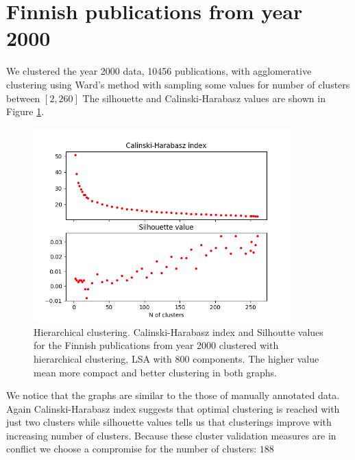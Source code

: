 \section{Finnish publications from year 2000}
We clustered the year 2000 data, 10456 publications, with 
agglomerative clustering using Ward's method with sampling some values
for number of clusters between $[2,260]$ 
The silhouette and Calinski-Harabasz values are shown in Figure 
\ref{fig:ch-silh-2000-h}.
\begin{figure}[ht]
  \begin{center}    
\includegraphics[width=10cm]{images/c-h-silh-index-plot-y2000-2_260-800-hierarchical.png}
    \caption{Hierarchical clustering. Calinski-Harabasz index and 
    Silhoutte values for the Finnish publications from year 2000 
    clustered with hierarchical clustering, LSA with 800 components. 
    The higher value mean more compact and better clustering in both graphs.}
    \label{fig:ch-silh-2000-h}
  \end{center}
\end{figure}
We notice that the graphs are similar to the those of manually
annotated data. Again Calinski-Harabasz index suggests that 
optimal clustering is reached with just two clusters while 
silhouette values tells us that clusterings improve with increasing
number of clusters. Because these cluster validation measures are
in conflict we choose a compromise for the number of clusters: $188$

